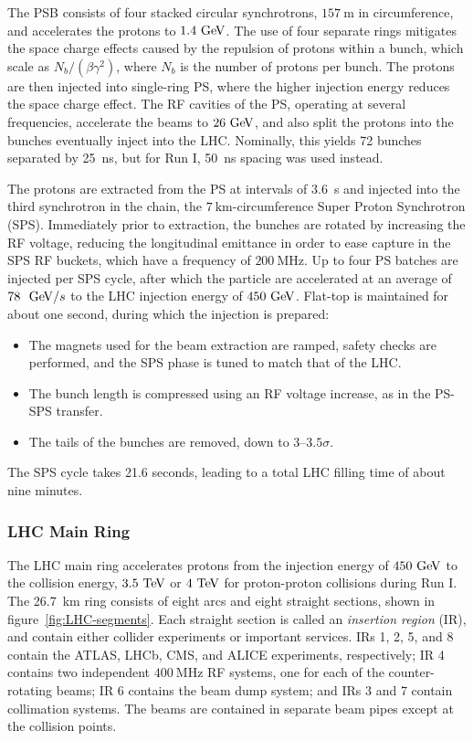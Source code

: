 The PSB consists of four stacked circular synchrotrons, $157~\mbox{m}$ in circumference, and accelerates the protons to $1.4 \GeV$. The use of four separate rings mitigates the space charge effects caused by the repulsion of protons within a bunch, which scale as $N_b/(\beta\gamma^2)$, where $N_b$ is the number of protons per bunch. The protons are then injected into single-ring PS, where the higher injection energy reduces the space charge effect. The RF cavities of the PS, operating at several frequencies, accelerate the beams to $26 \GeV$, and also split the protons into the bunches eventually inject into the LHC. Nominally, this yields 72 bunches separated by 25~ns, but for Run I, 50~ns spacing was used instead. 

The protons are extracted from the PS at intervals of 3.6~s and injected into the third synchrotron in the chain, the $7~\mbox{km}$-circumference Super Proton Synchrotron (SPS). Immediately prior to extraction, the bunches are rotated by increasing the RF voltage, reducing the longitudinal emittance in order to ease capture in the SPS RF buckets, which have a frequency of $200~\mbox{MHz}$.  Up to four PS batches are injected per SPS cycle, after which the particle are accelerated at an average of $78~\GeV/s$ to the LHC injection energy of $450 \GeV$. Flat-top is maintained for about one second, during which the injection is prepared:

\begin{itemize}
	\item The magnets used for the beam extraction are ramped, safety checks are performed, and the SPS phase is tuned to match that of the LHC.
	\item The bunch length is compressed using an RF voltage increase, as in the PS-SPS transfer.
	\item The tails of the bunches are removed, down to $3$--$3.5\sigma$.
\end{itemize}

The SPS cycle takes 21.6 seconds, leading to a total LHC filling time of about nine minutes.

\subsubsection{LHC Main Ring}
The LHC main ring accelerates protons from the injection energy of $450 \GeV$ to the collision energy, $3.5 \TeV$ or $4 \TeV$ for proton-proton collisions during Run I. The 26.7~km ring consists of eight arcs and eight straight sections, shown in figure~\ref{fig:LHC-segments}. Each straight section is called an \emph{insertion region} (IR), and contain either collider experiments or important services. IRs 1, 2, 5, and 8 contain the ATLAS, LHCb, CMS, and ALICE experiments, respectively; IR 4 contains two independent $400~\mbox{MHz}$ RF systems, one for each of the counter-rotating beams; IR 6 contains the beam dump system; and IRs 3 and 7 contain collimation systems. The beams are contained in separate beam pipes except at the collision points.

